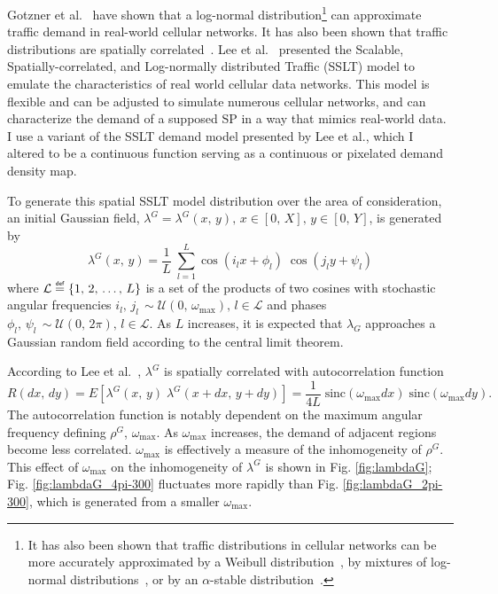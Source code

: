 \documentclass[12pt,dvipsnames]{report}
\newcommand\defeq{\mathrel{\overset{\makebox[0pt]{\mbox{\normalfont\tiny\sffamily def}}}{=}}}
\begin{document}
Gotzner et al.~\cite{686105} have shown that a log-normal distribution\footnote{It has also been shown that traffic distributions in cellular networks can be more accurately approximated by a Weibull distribution~\cite{6757900}, by mixtures of log-normal distributions~\cite{5936263, 6757900}, or by an $\alpha$-stable distribution~\cite{7202841}.} can approximate traffic demand in real-world cellular networks.  It has also been shown that traffic distributions are spatially correlated~\cite{5936263, eigenplaces}.  Lee et al.~\cite{6554749, 6757900} presented the Scalable, Spatially-correlated, and Log-normally distributed Traffic (SSLT) model to emulate the characteristics of real world cellular data networks.  This model is flexible and can be adjusted to simulate numerous cellular networks, and can characterize the demand of a supposed SP in a way that mimics real-world data.  I use a variant of the SSLT demand model presented by Lee et al., which I altered to be a continuous function serving as a continuous or pixelated demand density map.

To generate this spatial SSLT model distribution over the area of consideration, an initial Gaussian field, $\lambda^G = \lambda^G\left( x,\, y \right),\, x \in \left[ 0,\, X \right],\, y \in \left[ 0,\, Y \right]$, is generated by
\begin{equation} \label{eq:lambdaG}
\lambda^G\left( x,\, y \right) = \frac{1}{L} \; \sum_{l=1}^L \cos\left( i_l x + \phi_l \right) \; \cos\left( j_l y + \psi_l \right)
\end{equation}
where $\mathcal{L} \defeq \left\{ 1,\, 2,\, \ldots,\, L \right\}$ is a set of the products of two cosines with stochastic angular frequencies $i_l,\, j_l\, \sim \mathcal{U}\left( 0,\, \omega_{\max} \right),\, l \in \mathcal{L}$ and phases $\phi_l,\, \psi_l\, \sim \mathcal{U}\left( 0,\, 2 \pi \right),\, l \in \mathcal{L}$.  As $L$ increases, it is expected that $\lambda_G$ approaches a Gaussian random field according to the central limit theorem.

According to Lee et al.~\cite{6554749}, $\lambda^G$ is spatially correlated with autocorrelation function
\begin{equation} \label{eq:sslt_autocorrelation}
R\left( dx,\, dy \right) = E\left[ \lambda^G\left( x,\, y \right) \; \lambda^G\left( x + dx,\, y + dy \right) \right] = \frac{1}{4L} \; \text{sinc}\left( \omega_{\max} dx \right) \; \text{sinc}\left( \omega_{\max} dy \right).
\end{equation}
The autocorrelation function is notably dependent on the maximum angular frequency defining $\rho^G$, $\omega_{\max}$.  As $\omega_{\max}$ increases, the demand of adjacent regions become less correlated.  $\omega_{\max}$ is effectively a measure of the inhomogeneity of $\rho^G$.  This effect of $\omega_{\max}$ on the inhomogeneity of $\lambda^G$ is shown in Fig. \ref{fig:lambdaG}; Fig. \ref{fig:lambdaG_4pi-300} fluctuates more rapidly than Fig. \ref{fig:lambdaG_2pi-300}, which is generated from a smaller $\omega_{\max}$.
\end{document}
